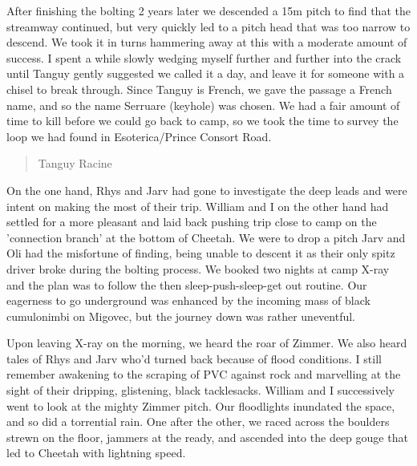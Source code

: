 \documentclass[onecolumn]{book}
\begin{document}
After finishing the bolting 2 years later we descended a 15m pitch to find that the streamway continued, but very quickly led to a pitch head that was too narrow to descend. We took it in turns hammering away at this with a moderate amount of success. I spent a while slowly wedging myself further and further into the crack until Tanguy gently suggested we called it a day, and leave it for someone with a chisel to break through. Since Tanguy is French, we gave the passage a French name, and so the name Serruare (keyhole) was chosen. We had a fair amount of time to kill before we could go back to camp, so we took the time to survey the loop we had found in Esoterica/Prince Consort Road.

\begin{verse}
Tanguy Racine
\end{verse}

On the one hand, Rhys and Jarv had gone to investigate the deep leads and were intent on making the most of their trip. William and I on the other hand had settled for a more pleasant and laid back pushing trip close to camp on the 'connection branch' at the bottom of Cheetah. We were to drop a pitch Jarv and Oli had the misfortune of finding, being unable to descent it as their only spitz driver broke during the bolting process. We booked two nights at camp X-ray and the plan was to follow the then sleep-push-sleep-get out routine. Our eagerness to go underground was enhanced by the incoming mass of black cumulonimbi on Migovec, but the journey down was rather uneventful.

Upon leaving X-ray on the morning, we heard the roar of Zimmer. We also heard tales of Rhys and Jarv who'd turned back because of flood conditions. I still remember awakening to the scraping of PVC against rock and marvelling at  the sight of their dripping, glistening, black tacklesacks. William and I successively went to look at the mighty Zimmer pitch. Our floodlights inundated the space, and so did a torrential rain. One after the other, we raced across the boulders strewn on the floor, jammers at the ready, and ascended into the deep gouge that led to Cheetah with lightning speed.
\end{document}
